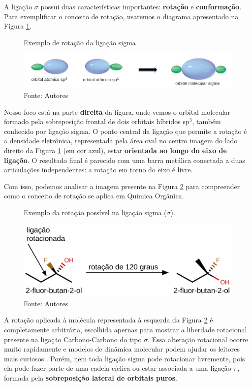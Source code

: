 A ligação $\sigma$ possui duas características importantes: \textbf{rotação} e \textbf{conformação}. Para exemplificar o conceito de rotação, usaremos o diagrama apresentado na Figura \ref{fig:om}.

\begin{figure}[h]
\centering
\caption{Exemplo de rotação da ligação sigma}
\vspace{0.25cm}
\label{fig:om}
\includegraphics[width=1\linewidth]{imagens/om2.png}
\caption*{Fonte: Autores}
\end{figure}

Nosso foco está na parte \textbf{direita} da figura, onde vemos o orbital molecular formado pela sobreposição frontal de dois orbitais híbridos sp$^3$, também conhecido por ligação sigma. O ponto central da ligação que permite a rotação é a densidade eletrônica, representada pela área oval no centro imagem do lado direito da Figura \ref{fig:om} (em cor azul), estar \textbf{orientada ao longo do eixo de ligação}. O resultado final é parecido com uma barra metálica conectada a duas articulações independentes: a rotação em torno do eixo é livre. 

Com isso, podemos analisar a imagem presente na Figura \ref{fig:rotacao} para compreender como o conceito de rotação se aplica em Química Orgânica.

\begin{figure}[h]
\centering
\caption{Exemplo da rotação possível na ligação sigma ($\sigma$).}
\vspace{0.25cm}
\label{fig:rotacao}
\includegraphics[width=0.75\linewidth]{imagens/rotacao.png}
\caption*{Fonte: Autores}
\end{figure}

A rotação aplicada à molécula representada à esquerda da Figura \ref{fig:rotacao} é completamente arbitrária, escolhida apernas para mostrar a liberdade rotacional presente na ligação Carbono-Carbono do tipo $\sigma$. Essa alteração rotacional ocorre muito rapidamente e modelos de dinâmica molecular podem ajudar os leitores mais curiosos \cite{Monticelli2013}. Porém, nem toda ligação sigma pode rotacionar livremente, pois ela pode fazer parte de uma cadeia cíclica ou estar associada a uma ligação $\pi$, formada pela \textbf{sobreposição lateral de orbitais puros}.

